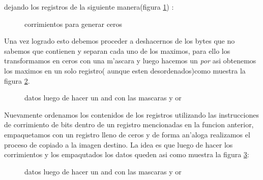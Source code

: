 dejando los registros de la siguiente manera(figura \ref{est:m-siete}) : \\
\begin{figure}[hb]
\caption{corrimientos para generar ceros}
\label{est:m-siete}
\end{figure}
Una vez logrado esto debemos proceder a deshacernos de los bytes que no sabemos que contienen y separan
cada uno de los maximos, para ello los transformamos en ceros con una m'ascara y luego hacemos un \textit{por} 
asi obtenemos los maximos en un solo registro( aunque esten desordenados)como muestra la figura \ref{est:m-ocho}.\\
\begin{figure}[hb]
\caption{datos luego de hacer un and con las mascaras y or}
\label{est:m-ocho}
\end{figure}
Nuevamente ordenamos los contenidos de los registros utilizando las instrucciones de corrimiento de bits
dentro de un registro mencionadas en la funcion anterior, empaquetamos con un registro lleno de ceros
 y de forma an'aloga realizamos el proceso de copiado a la imagen destino. La idea es que luego de
hacer los corrimientos y los empaqutados los datos queden asi como muestra la figura \ref{est:m-nueve}:\\
\begin{figure}[hb]
\caption{datos luego de hacer un and con las mascaras y or}
\label{est:m-nueve}
\end{figure}




 
 


